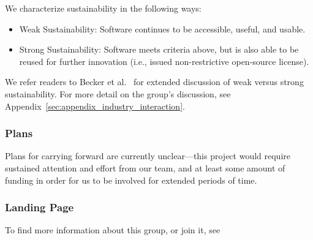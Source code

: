We characterize sustainability in the following ways:
\begin{itemize}

\item Weak Sustainability: Software continues to be accessible, useful, and
usable.

\item Strong Sustainability: Software meets criteria above, but is also able to
be reused for further innovation (i.e., issued non-restrictive open-source
license).

\end{itemize}
We refer readers to Becker et al.~\cite{Becker:2014} for extended discussion of weak versus strong
sustainability. For more detail on the group's discussion, see
Appendix~\ref{sec:appendix_industry_interaction}.

\subsubsection{Plans}

Plans for carrying forward are currently unclear---this project would require
sustained attention and effort from our team, and at least some amount of
funding in order for us to be involved for extended periods of time.

\subsubsection{Landing Page}

To find more information about this group, or join it, see 

